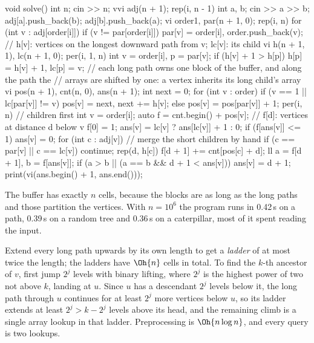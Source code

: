 \begin{code}
void solve() {
    int n;
    cin >> n;
    vvi adj(n + 1);
    rep(i, n - 1) {
        int a, b;
        cin >> a >> b;
        adj[a].push_back(b);
        adj[b].push_back(a);
    }
    vi order{1}, par(n + 1, 0);
    rep(i, n) for (int v : adj[order[i]])
        if (v != par[order[i]]) par[v] = order[i], order.push_back(v);
    // h[v]: vertices on the longest downward path from v; lc[v]: its child
    vi h(n + 1, 1), lc(n + 1, 0);
    per(i, 1, n) {
        int v = order[i], p = par[v];
        if (h[v] + 1 > h[p]) h[p] = h[v] + 1, lc[p] = v;
    }
    // each long path owns one block of the buffer, and along the path the
    // arrays are shifted by one: a vertex inherits its long child's array
    vi pos(n + 1), cnt(n, 0), ans(n + 1);
    int next = 0;
    for (int v : order) {
        if (v == 1 || lc[par[v]] != v) pos[v] = next, next += h[v];
        else pos[v] = pos[par[v]] + 1;
    }
    per(i, n) {  // children first
        int v = order[i];
        auto f = cnt.begin() + pos[v];  // f[d]: vertices at distance d below v
        f[0] = 1;
        ans[v] = lc[v] ? ans[lc[v]] + 1 : 0;
        if (f[ans[v]] <= 1) ans[v] = 0;
        for (int c : adj[v]) {  // merge the short children by hand
            if (c == par[v] || c == lc[v]) continue;
            rep(d, h[c]) {
                f[d + 1] += cnt[pos[c] + d];
                ll a = f[d + 1], b = f[ans[v]];
                if (a > b || (a == b && d + 1 < ans[v])) ans[v] = d + 1;
            }
        }
    }
    print(vi(ans.begin() + 1, ans.end()));
}
\end{code}


The buffer has exactly $n$ cells, because the blocks are as long as the long paths and those partition the vertices. With $n =
10^6$ the program runs in 0.42\,s on a path, 0.39\,s on a random tree and 0.36\,s on a caterpillar, most of it spent reading the
input.

\begin{trick}
Extend every long path upwards by its own length to get a \emph{ladder} of at most twice the length; the ladders have $\Oh{n}$
cells in total. To find the $k$-th ancestor of $v$, first jump $2^j$ levels with binary lifting, where $2^j$ is the highest power
of two not above $k$, landing at $u$. Since $u$ has a descendant $2^j$ levels below it, the long path through $u$ continues for at
least $2^j$ more vertices below $u$, so its ladder extends at least $2^j > k - 2^j$ levels above its head, and the remaining
climb is a single array lookup in that ladder. Preprocessing is $\Oh{n \log n}$, and every query is two lookups.
\end{trick}

